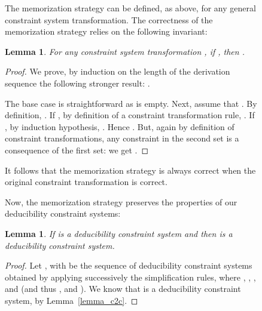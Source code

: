 \documentclass[acmtocl,acmnow]{acmtrans2m}
\newtheorem{lemma}[theorem]{Lemma}
\newcommand{\dedsys}[1]{deducibility constraint system}
\newcommand{\dedsyss}[1]{deducibility constraint systems}
\begin{document}
\begin{figure}[t]
{{The memorization strategy can be defined, as above,
 for any general constraint system transformation.
 The correctness of the memorization strategy
relies on the following invariant:

\begin{lemma}\label{lemma:redundancy}
For any  constraint system transformation , if , then .
\end{lemma}

\begin{proof}
We prove, by induction on the length of the derivation sequence the following
stronger  result: .

The base case is straightforward as  is empty. Next, assume that
. By definition, . If
, by definition of a constraint transformation rule,
. If , by induction hypothesis,
. Hence . But, again by definition of constraint transformations, any constraint in the second set is a consequence of the first set:
we get . 
\end{proof}

It follows that the memorization strategy is always correct when the
original constraint transformation is correct.

















































Now, the memorization strategy preserves the properties of our \dedsyss{}:
\begin{lemma}\label{lemma:preserves_origination}
If  is a \dedsys{} and
 then  is a \dedsys{}.
\end{lemma}
\begin{proof}
Let , with  be the sequence of
\dedsyss{} obtained by applying
successively the simplification rules, where ,
, , and
 (and thus , and ).
We know that  is a \dedsys{}, by Lemma~\ref{lemma_c2c}. 


\end{proof}}}
\end{figure}
\end{document}
